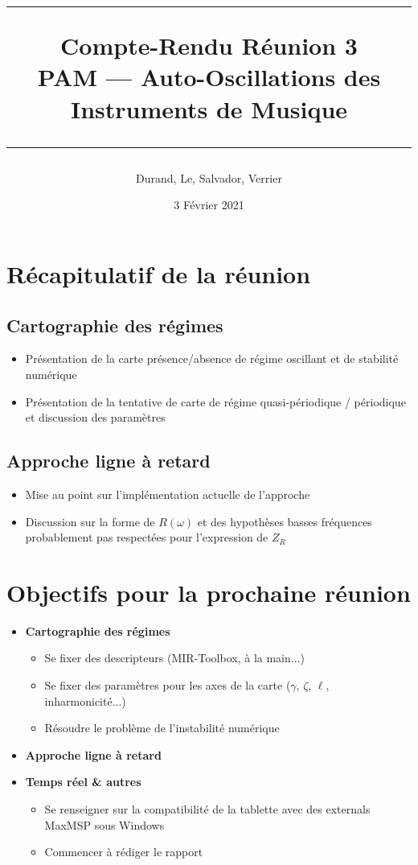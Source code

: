 \documentclass[a4paper, 11pt]{article}
\title{
	\noindent\rule{\linewidth}{0.4pt}
	\huge{Compte-Rendu Réunion 3\\}
	\medskip
	\Large{PAM --- Auto-Oscillations des Instruments de Musique}
	\noindent\rule{\linewidth}{1pt}
}
\author{Durand, Le, Salvador, Verrier}
\date{3 Février 2021}
\begin{document}
\maketitle


\section{Récapitulatif de la réunion}
\subsection{Cartographie des régimes}
\begin{itemize}
	\item Présentation de la carte présence/absence de régime oscillant et de stabilité numérique
	\item Présentation de la tentative de carte de régime quasi-périodique / périodique et discussion des paramètres
\end{itemize}
\subsection{Approche ligne à retard}
\begin{itemize}
	\item Mise au point sur l'implémentation actuelle de l'approche
	\item Discussion sur la forme de $R(\omega)$ et des hypothèses basses fréquences probablement pas respectées pour l'expression de $Z_R$ 
\end{itemize}

\section{Objectifs pour la prochaine réunion}
\begin{itemize}
	\item \textbf{Cartographie des régimes}
	\begin{itemize}
		\item Se fixer des descripteurs (MIR-Toolbox, à la main...)
		\item Se fixer des paramètres pour les axes de la carte ($\gamma$, $\zeta$, $\ell$, inharmonicité...)
		\item Résoudre le problème de l'instabilité numérique
	\end{itemize}
	\item \textbf{Approche ligne à retard}
	
	\item \textbf{Temps réel \& autres}
	\begin{itemize}
		\item Se renseigner sur la compatibilité de la tablette avec des externals MaxMSP sous Windows
		\item Commencer à rédiger le rapport
	\end{itemize}
\end{itemize}
\end{document}
